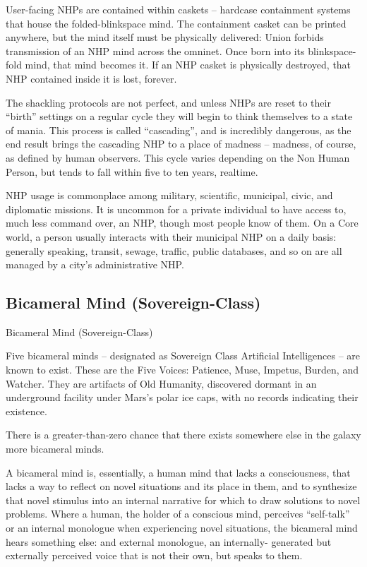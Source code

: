 User-facing NHPs are contained within caskets -- hardcase containment systems that house the  
folded-blinkspace mind. The containment casket can be printed anywhere, but the mind itself  
must be physically delivered: Union forbids transmission of an NHP mind across the omninet.  
Once born into its blinkspace-fold mind, that mind becomes it. If an NHP casket is physically  
destroyed, that NHP contained inside it is lost, forever.  
 

                                                                                                          


The shackling protocols are not perfect, and unless NHPs are reset to their “birth” settings on a  
regular cycle they will begin to think themselves to a state of mania. This process is called  
“cascading”, and is incredibly dangerous, as the end result brings the cascading NHP to a place  
of madness -- madness, of course, as defined by human observers. This cycle varies depending  
on the Non Human Person, but tends to fall within five to ten years, realtime. 
 

NHP usage is commonplace among military, scientific, municipal, civic, and diplomatic missions.  
It is uncommon for a private individual to have access to, much less command over, an NHP,  
though most people know of them. On a Core world, a person usually interacts with their  
municipal NHP on a daily basis: generally speaking, transit, sewage, traffic, public databases,  
and so on are all managed by a city’s administrative NHP. 
 
\subsection{Bicameral Mind (Sovereign-Class)}
Bicameral Mind (Sovereign-Class)  

Five bicameral minds -- designated as Sovereign Class Artificial Intelligences -- are known to  
exist. These are the Five Voices: Patience, Muse, Impetus, Burden, and Watcher. They are  
artifacts of Old Humanity, discovered dormant in an underground facility under Mars’s polar ice  
caps, with no records indicating their existence.
 

There is a greater-than-zero chance that there exists somewhere else in the galaxy more  
bicameral minds.  
 

A bicameral mind is, essentially, a human mind that lacks a consciousness, that lacks a way to  
reflect on novel situations and its place in them, and to synthesize that novel stimulus into an  
internal narrative for which to draw solutions to novel problems. Where a human, the holder of a  
conscious mind, perceives “self-talk” or an internal monologue when experiencing novel  
situations, the bicameral mind hears something else: and external monologue, an internally- 
generated but externally perceived voice that is not their own, but speaks to them. 
 

